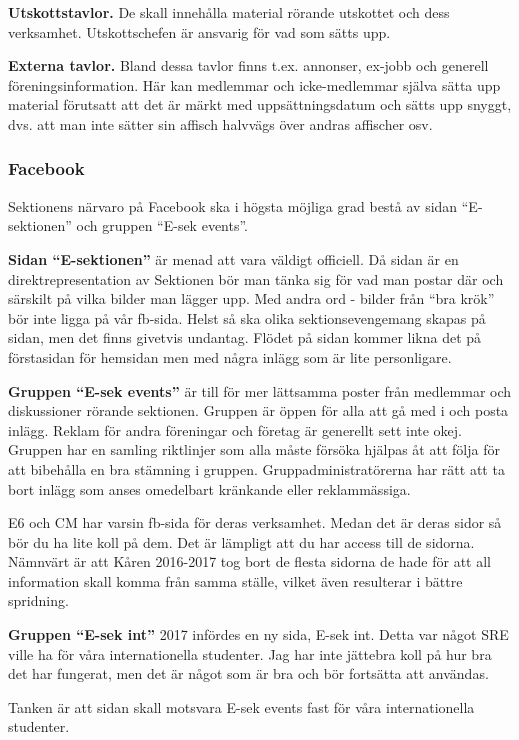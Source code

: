 \documentclass[10pt]{article}
\begin{document}
\textbf{Utskottstavlor.} De skall innehålla material rörande utskottet och dess verksamhet. Utskottschefen är ansvarig för vad som sätts upp.

\textbf{Externa tavlor.} Bland dessa tavlor finns t.ex. annonser, ex-jobb och generell föreningsinformation. Här kan medlemmar och icke-medlemmar själva sätta upp material förutsatt att det är märkt med uppsättningsdatum och sätts upp snyggt, dvs. att man inte sätter sin affisch halvvägs över andras affischer osv.

\subsubsection{Facebook}
Sektionens närvaro på Facebook ska i högsta möjliga grad bestå av sidan ``E-sektionen'' och gruppen ``E-sek events''.

\textbf{Sidan ``E-sektionen''} är menad att vara väldigt officiell. Då sidan är en direktrepresentation av Sektionen bör man tänka sig för vad man postar där och särskilt på vilka bilder man lägger upp. Med andra ord - bilder från ``bra krök'' bör inte ligga på vår fb-sida. Helst så ska olika sektionsevengemang skapas på sidan, men det finns givetvis undantag. Flödet på sidan kommer likna det på förstasidan för hemsidan men med några inlägg som är lite personligare.

\textbf{Gruppen ``E-sek events''} är till för mer lättsamma poster från medlemmar och diskussioner rörande sektionen. Gruppen är öppen för alla att gå med i och posta inlägg. Reklam för andra föreningar och företag är generellt sett inte okej. Gruppen har en samling riktlinjer som alla måste försöka hjälpas åt att följa för att bibehålla en bra stämning i gruppen. Gruppadministratörerna har rätt att ta bort inlägg som anses omedelbart kränkande eller reklammässiga.

E6 och CM har varsin fb-sida för deras verksamhet. Medan det är deras sidor så bör du ha lite koll på dem. Det är lämpligt att du har access till de sidorna. Nämnvärt är att Kåren 2016-2017 tog bort de flesta sidorna de hade för att all information skall komma från samma ställe, vilket även resulterar i bättre spridning.

\textbf{Gruppen ``E-sek int''}
2017 infördes en ny sida, E-sek int. Detta var något SRE ville ha för våra internationella studenter. Jag har inte jättebra koll på hur bra det har fungerat, men det är något som är bra och bör fortsätta att användas.

Tanken är att sidan skall motsvara E-sek events fast för våra internationella studenter.
\end{document}
